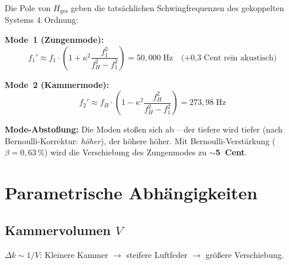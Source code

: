 \documentclass[11pt,a4paper]{article}
\begin{document}
Die Pole von $H_\text{ges}$ geben die tatsächlichen Schwingfrequenzen des gekoppelten Systems 4.\,Ordnung:

\textbf{Mode~1 (Zungenmode):}
\begin{equation}
f_1' \approx f_1 \cdot \left(1 + \kappa^2 \frac{f_1^2}{f_H^2 - f_1^2}\right) = 50{,}000\;\text{Hz} \quad \text{(+0{,}3 Cent rein akustisch)}
\end{equation}

\textbf{Mode~2 (Kammermode):}
\begin{equation}
f_2' \approx f_H \cdot \left(1 - \kappa^2 \frac{f_H^2}{f_H^2 - f_1^2}\right) = 273{,}98\;\text{Hz}
\end{equation}

\textbf{Mode-Abstoßung:} Die Moden stoßen sich ab -- der tiefere wird tiefer (nach Bernoulli-Korrektur: \textit{höher}), der höhere höher. Mit Bernoulli-Verstärkung ($\beta = 0{,}63\,\%$) wird die Verschiebung des Zungenmodes zu \textbf{$\sim$5~Cent}.

\section{Parametrische Abhängigkeiten}

\subsection{Kammervolumen $V$}

$\Delta k \sim 1/V$: Kleinere Kammer $\to$ steifere Luftfeder $\to$ größere Verschiebung.

\begin{table}[H]
\centering\small
{}
\caption{Frequenzverschiebung als Funktion des Kammervolumens}
\end{table}
\end{document}
